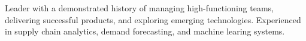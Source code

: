 

\begin{cvparagraph}

	Leader with a demonstrated history of managing high-functioning teams,
  delivering successful products, and exploring emerging technologies.
  Experienced in supply chain analytics, demand forecasting, and machine learing systems.
\end{cvparagraph}
